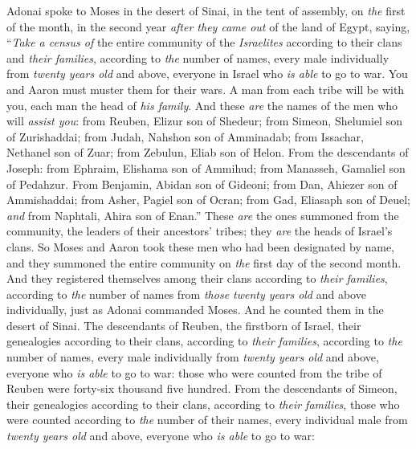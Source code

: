 
\begin{biblechapter} %
 Adonai spoke to Moses in the desert of Sinai, in the tent of assembly, on \textit{the} first of the month, in the second year \textit{after they came out} of the land of Egypt, saying,
\verse “\textit{Take a census of} the entire community of the \textit{Israelites} according to their clans and \textit{their families}, according to \textit{the} number of names, every male individually
\verse from \textit{twenty years old} and above, everyone in Israel who \textit{is able} to go to war. You and Aaron must muster them for their wars.
\verse A man from each tribe will be with you, each man the head of \textit{his family}.
\verse And these \textit{are} the names of the men who will \textit{assist you}: from Reuben, Elizur son of Shedeur;
\verse from Simeon, Shelumiel son of Zurishaddai;
\verse from Judah, Nahshon son of Amminadab;
\verse from Issachar, Nethanel son of Zuar;
\verse from Zebulun, Eliab son of Helon.
\verse From the descendants of Joseph: from Ephraim, Elishama son of Ammihud; from Manasseh, Gamaliel son of Pedahzur.
\verse From Benjamin, Abidan son of Gideoni;
\verse from Dan, Ahiezer son of Ammishaddai;
\verse from Asher, Pagiel son of Ocran;
\verse from Gad, Eliasaph son of Deuel;
\verse \textit{and} from Naphtali, Ahira son of Enan.”
\verse These \textit{are} the ones summoned from the community, the leaders of their ancestors’ tribes; they \textit{are} the heads of Israel’s clans.
\verse So Moses and Aaron took these men who had been designated by name,
\verse and they summoned the entire community on \textit{the} first day of the second month. And they registered themselves among their clans according to \textit{their families}, according to \textit{the} number of names from \textit{those twenty years old} and above individually,
\verse just as Adonai commanded Moses. And he counted them in the desert of Sinai.
\verse The descendants of Reuben, the firstborn of Israel, their genealogies according to their clans, according to \textit{their families}, according to \textit{the} number of names, every male individually from \textit{twenty years old} and above, everyone who \textit{is able} to go to war:
\verse those who were counted from the tribe of Reuben were forty-six thousand five hundred.
\verse From the descendants of Simeon, their genealogies according to their clans, according to \textit{their families}, those who were counted according to \textit{the} number of their names, every individual male from \textit{twenty years old} and above, everyone who \textit{is able} to go to war:

\end{biblechapter}
